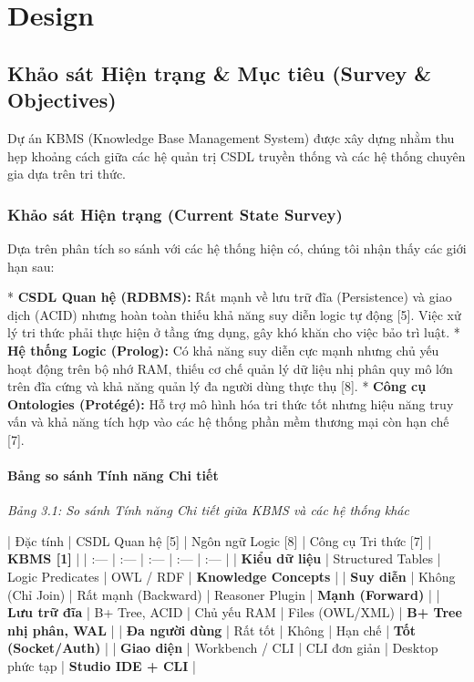 \chapter{Design}
\section{Khảo sát Hiện trạng & Mục tiêu (Survey & Objectives)}

Dự án KBMS (Knowledge Base Management System) được xây dựng nhằm thu hẹp khoảng cách giữa các hệ quản trị CSDL truyền thống và các hệ thống chuyên gia dựa trên tri thức.

\subsection{Khảo sát Hiện trạng (Current State Survey)}

Dựa trên phân tích so sánh với các hệ thống hiện có, chúng tôi nhận thấy các giới hạn sau:

*   \textbf{CSDL Quan hệ (RDBMS):} Rất mạnh về lưu trữ đĩa (Persistence) và giao dịch (ACID) nhưng hoàn toàn thiếu khả năng suy diễn logic tự động [5]. Việc xử lý tri thức phải thực hiện ở tầng ứng dụng, gây khó khăn cho việc bảo trì luật.
*   \textbf{Hệ thống Logic (Prolog):} Có khả năng suy diễn cực mạnh nhưng chủ yếu hoạt động trên bộ nhớ RAM, thiếu cơ chế quản lý dữ liệu nhị phân quy mô lớn trên đĩa cứng và khả năng quản lý đa người dùng thực thụ [8].
*   \textbf{Công cụ Ontologies (Protégé):} Hỗ trợ mô hình hóa tri thức tốt nhưng hiệu năng truy vấn và khả năng tích hợp vào các hệ thống phần mềm thương mại còn hạn chế [7].

\subsubsection{Bảng so sánh Tính năng Chi tiết}

\textit{Bảng 3.1: So sánh Tính năng Chi tiết giữa KBMS và các hệ thống khác}

| Đặc tính | CSDL Quan hệ [5] | Ngôn ngữ Logic [8] | Công cụ Tri thức [7] | \textbf{KBMS [1]} |
| :--- | :--- | :--- | :--- | :--- |
| \textbf{Kiểu dữ liệu} | Structured Tables | Logic Predicates | OWL / RDF | \textbf{Knowledge Concepts} |
| \textbf{Suy diễn} | Không (Chỉ Join) | Rất mạnh (Backward) | Reasoner Plugin | \textbf{Mạnh (Forward)} |
| \textbf{Lưu trữ đĩa} | B+ Tree, ACID | Chủ yếu RAM | Files (OWL/XML) | \textbf{B+ Tree nhị phân, WAL} |
| \textbf{Đa người dùng} | Rất tốt | Không | Hạn chế | \textbf{Tốt (Socket/Auth)} |
| \textbf{Giao diện} | Workbench / CLI | CLI đơn giản | Desktop phức tạp | \textbf{Studio IDE + CLI} |

